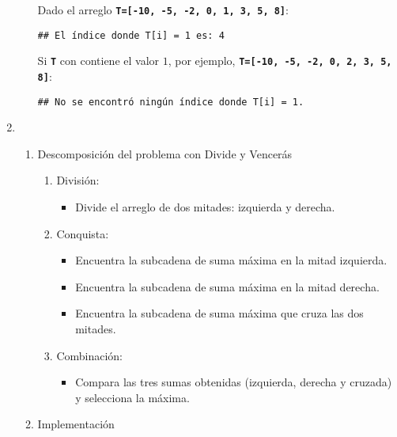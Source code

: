 \begin{enumerate}[label=\color{red}\textbf{\arabic*)}]
\begin{enumerate}[label=\arabic*)]
      Dado el arreglo \textbf{\texttt{T=[-10, -5, -2, 0, 1, 3, 5, 8]}}:
\begin{verbatim}
## El índice donde T[i] = 1 es: 4
\end{verbatim}
Si \textbf{\texttt{T}} con contiene el valor $1$, por ejemplo, \textbf{\texttt{T=[-10, -5, -2, 0, 2, 3, 5, 8]}}:
\begin{verbatim}
## No se encontró ningún índice donde T[i] = 1.
\end{verbatim}
\end{enumerate}
\item {} 

    \begin{enumerate}[label=\arabic*)]
      \item Descomposición del problema con Divide y Vencerás
        \begin{enumerate}[label=\arabic*)]
          \item División:
            \begin{itemize}[label=\textbullet]
              \item  Divide el arreglo de dos mitades: izquierda y derecha.
            \end{itemize}
          \item Conquista:
            \begin{itemize}[label=\textbullet]
              \item  Encuentra la subcadena de suma máxima en la mitad izquierda.
              \item Encuentra la subcadena de suma máxima en la mitad derecha.
              \item Encuentra la subcadena de suma máxima que cruza las dos mitades.
            \end{itemize}
          \item Combinación:
            \begin{itemize}[label=\textbullet]
              \item Compara las tres sumas obtenidas (izquierda, derecha y cruzada) y selecciona la máxima.
            \end{itemize}
        \end{enumerate}
      \item Implementación


\end{enumerate}
\end{enumerate}
